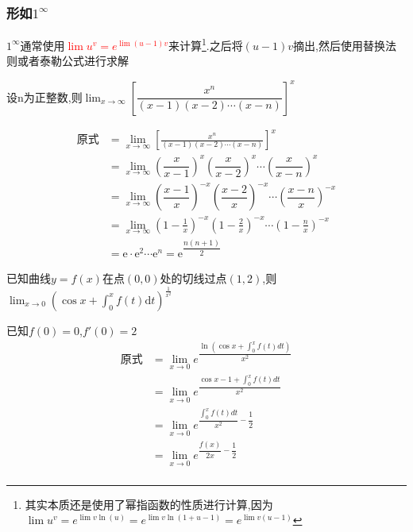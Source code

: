 \documentclass[8pt a4paper, oneside, UTF8]{ctexbook}
\begin{document}
\begin{sloppypar}
    \subsubsection{形如$1^{\infty}$}
         $1 ^ \infty$通常使用\textcolor{red}{$\lim u^v=e^{\lim (u-1)v}$}来计算\footnote{其实本质还是使用了幂指函数的性质进行计算,因为$\lim u^v=e^{\lim v\ln(u)}=e^{\lim v \ln(1 + u -1)}=e^{\lim v (u-1)}$}.之后将$(u-1)v$摘出,然后使用替换法则或者泰勒公式进行求解
        \begin{problem}
            设n为正整数,则$\lim_{x\to\infty}[\dfrac{x^{n}}{\left(x-1\right)\left(x-2\right)\cdots\left(x-n\right)}]^{x}$
        \end{problem}
        \begin{solution}
            \begin{align*}
              \text{原式} & = \lim_{x\to\infty}\left[\frac{x^n}{(x-1)(x-2)\cdots(x-n)}\right]^x \\    
              & = \lim_{x\to \infty} \left( \dfrac{x}{x-1}\right)^x\left(\dfrac{x}{x-2} \right)^x \cdots \left(\dfrac{x}{x-n}\right)^x\\
              & = \lim_{x \to \infty}\left( \dfrac{x-1}{x}\right)^{-x}\left(\dfrac{x-2}{x} \right)^{-x} \cdots \left(\dfrac{x-n}{x}\right)^{-x}\\
              & = \lim_{x\to\infty}\left(1-\frac{1}{x}\right)^{-x}\left(1-\frac{2}{x}\right)^{-x}\cdots\left(1-\frac{n}{x}\right)^{-x}\\
                & = \mathrm{e}\cdot\mathrm{e}^2\cdots\mathrm{e}^n = \mathrm{e}^{\dfrac{n(n+1)}2}
            \end{align*}
        \end{solution}
         \begin{problem}
            已知曲线$y=f(x)$在点$(0,0)$处的切线过点$(1,2)$,则$\lim_{x\to0}\left(\cos x+\int_0^xf(t)\mathrm{d}t\right)^{\frac{1}{x^2}}$
        \end{problem}
        \begin{solution}
            已知$f(0)=0$,$f'(0)=2$
            \begin{align*}
                \text{原式} & = \lim_{x \to 0}e^{\dfrac{\ln\left(\cos x+\int_0^x f(t)dt\right)}{x^2}}\\
                & =  \lim_{x\to 0}e^{\dfrac{\cos x-1+\int_0^xf(t)dt}{x^2}}\\
                & = \lim_{x\to 0}e^{\dfrac{\int_0^x f(t)dt}{x^2}-\dfrac{1}{2}}\\
                & = \lim_{x\to 0}e^{\dfrac{f(x)}{2x}-\dfrac{1}{2}}\\

\end{align*}
\end{solution}
\end{sloppypar}
\end{document}
